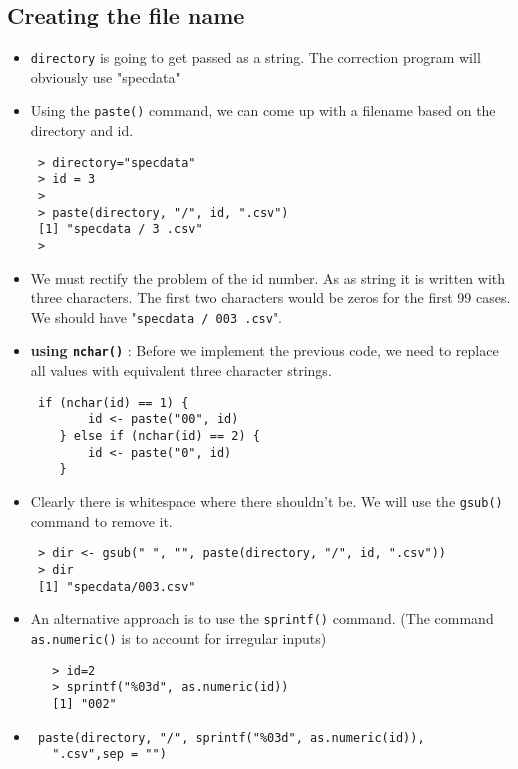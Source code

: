 \documentclass[]{article}
\begin{document}
 \subsection{Creating the file name}
 \begin{itemize}
  \item \texttt{directory} is going to get passed as a string. The correction program will obviously use "specdata"
  \item Using the \texttt{paste()} command, we can come up with a filename based on the directory and id.
 \begin{verbatim}
 > directory="specdata"
 > id = 3
 > 
 > paste(directory, "/", id, ".csv")
 [1] "specdata / 3 .csv"
 > 
 \end{verbatim}
  \item We must rectify the problem of the id number. As as string it is written with three characters. The first two characters would be zeros for the first 99 cases.
 We should have "\texttt{specdata / 003 .csv}".
 \item \textbf{using \texttt{nchar()}} : Before we implement the previous code, we need to replace all values with equivalent three character strings.
 \begin{verbatim}
 if (nchar(id) == 1) {
    	id <- paste("00", id)
    } else if (nchar(id) == 2) {
    	id <- paste("0", id)
    }
 \end{verbatim}

 \item Clearly there is whitespace where there shouldn't be. We will use the \texttt{gsub()} command to remove it. 
 \begin{verbatim}
 > dir <- gsub(" ", "", paste(directory, "/", id, ".csv"))
 > dir
 [1] "specdata/003.csv"
  \end{verbatim}
\newpage
   \item An alternative approach is to use the \texttt{sprintf()} command. (The command \texttt{as.numeric()} is to account for irregular inputs)
   \begin{verbatim}
   > id=2
   > sprintf("%03d", as.numeric(id))
   [1] "002"
   \end{verbatim}
   
 \item 
 \begin{framed}
 \begin{verbatim}
 paste(directory, "/", sprintf("%03d", as.numeric(id)),
   ".csv",sep = "")
 \end{verbatim}
 \end{framed}
 \end{itemize}
 \newpage
\end{document}
